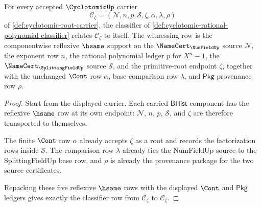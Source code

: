 \begin{theorem}
\label{thm:cyclotomic-classifier-reflexive}
For every accepted $\CyclotomicUp$ carrier
$$
\mathcal{C}_{\zeta}=(\mathcal{N},n,p,\mathcal{S},\zeta,\alpha,\lambda,\rho)
$$
of \autoref{def:cyclotomic-root-carrier}, the classifier of \autoref{def:cyclotomic-rational-polynomial-classifier} relates $\mathcal{C}_{\zeta}$ to itself. The witnessing row is the componentwise reflexive $\hsame$ support on the $\NameCert_{\NumFieldUp}$ source $\mathcal{N}$, the exponent row $n$, the rational polynomial ledger $p$ for $X^n-1$, the $\NameCert_{\SplittingFieldUp}$ source $\mathcal{S}$, and the primitive-root endpoint $\zeta$, together with the unchanged $\Cont$ row $\alpha$, base comparison row $\lambda$, and $\mathsf{Pkg}$ provenance row $\rho$.
\end{theorem}
\begin{proof}
Start from the displayed carrier. Each carried $\mathsf{BHist}$ component has the reflexive $\hsame$ row at its own endpoint: $\mathcal{N}$, $n$, $p$, $\mathcal{S}$, and $\zeta$ are therefore transported to themselves.

The finite $\Cont$ row $\alpha$ already accepts $\zeta$ as a root and records the factorization rows inside $\mathcal{S}$. The comparison row $\lambda$ already ties the NumFieldUp source to the SplittingFieldUp base row, and $\rho$ is already the provenance package for the two source certificates.

Repacking these five reflexive $\hsame$ rows with the displayed $\Cont$ and $\mathsf{Pkg}$ ledgers gives exactly the classifier row from $\mathcal{C}_{\zeta}$ to $\mathcal{C}_{\zeta}$.
\end{proof}

